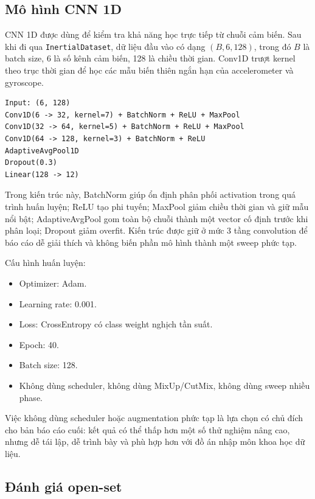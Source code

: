 \documentclass[12pt,a4paper]{article}
\begin{document}
\subsection{Mô hình CNN 1D}

CNN 1D được dùng để kiểm tra khả năng học trực tiếp từ chuỗi cảm biến. Sau khi đi qua \texttt{InertialDataset}, dữ liệu đầu vào có dạng \((B, 6, 128)\), trong đó \(B\) là batch size, 6 là số kênh cảm biến, 128 là chiều thời gian. Conv1D trượt kernel theo trục thời gian để học các mẫu biến thiên ngắn hạn của accelerometer và gyroscope.

\begin{lstlisting}
Input: (6, 128)
Conv1D(6 -> 32, kernel=7) + BatchNorm + ReLU + MaxPool
Conv1D(32 -> 64, kernel=5) + BatchNorm + ReLU + MaxPool
Conv1D(64 -> 128, kernel=3) + BatchNorm + ReLU
AdaptiveAvgPool1D
Dropout(0.3)
Linear(128 -> 12)
\end{lstlisting}

Trong kiến trúc này, BatchNorm giúp ổn định phân phối activation trong quá trình huấn luyện; ReLU tạo phi tuyến; MaxPool giảm chiều thời gian và giữ mẫu nổi bật; AdaptiveAvgPool gom toàn bộ chuỗi thành một vector cố định trước khi phân loại; Dropout giảm overfit. Kiến trúc được giữ ở mức 3 tầng convolution để báo cáo dễ giải thích và không biến phần mô hình thành một sweep phức tạp.

Cấu hình huấn luyện:

\begin{itemize}
    \item Optimizer: Adam.
    \item Learning rate: 0.001.
    \item Loss: CrossEntropy có class weight nghịch tần suất.
    \item Epoch: 40.
    \item Batch size: 128.
    \item Không dùng scheduler, không dùng MixUp/CutMix, không dùng sweep nhiều phase.
\end{itemize}

Việc không dùng scheduler hoặc augmentation phức tạp là lựa chọn có chủ đích cho bản báo cáo cuối: kết quả có thể thấp hơn một số thử nghiệm nâng cao, nhưng dễ tái lập, dễ trình bày và phù hợp hơn với đồ án nhập môn khoa học dữ liệu.

\subsection{Đánh giá open-set}
\end{document}
